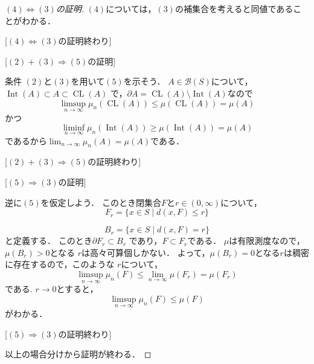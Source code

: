 \documentclass[leqno, a4paper, 12pt]{jsarticle}
\newcommand{\To}{\Longrightarrow}
\DeclareMathOperator{\cl}{CL}
\DeclareMathOperator{\nai}{Int}
\begin{document}
\begin{proof}
[$(4)\iff (3)$の証明]

$(4)$については，$(3)$の補集合を考えると同値であることがわかる．

[$(4)\iff (3)$の証明終わり]

[$(2)+(3)\To(5)$の証明]

条件
$(2)$と$(3)$を用いて$(5)$を示そう．
$A\in \mathcal{B}(S)$について，$\nai(A)\subset A\subset \cl(A)$
で，$\partial A=\cl(A)\setminus \nai(A)$なので
\[
\limsup_{n\to \infty}\mu_n(\cl(A))\le \mu(\cl(A))=\mu(A)
\]
かつ
\[
\liminf_{n\to \infty}\mu_n(\nai(A))\ge \mu(\nai(A))=\mu(A)
\]
であるから$\lim_{n\to \infty}\mu_n(A)=\mu(A)$である．

[$(2)+(3)\To(5)$の証明終わり]

[$(5)\To(3)$の証明]

逆に$(5)$を仮定しよう．
このとき閉集合$F$と$r\in  (0, \infty)$について，
\[
F_{r}=\{x\in S\mid d(x, F)\le r\}
\]

\[
B_r=\{x\in S\mid d(x, F)=r\}
\]
と定義する．
このとき$\partial F_r\subset B_r$
であり，$F\subset F_r$である．
$\mu$は有限測度なので，$\mu(B_r)>0$となる
$r$は高々可算個しかない．
よって，$\mu(B_r)=0$となる$r$は稠密に存在するので，このような
$r$について，
\[
\limsup_{n\to \infty}\mu_n(F)\le \lim_{n\to \infty}\mu(F_r)=\mu(F_r)
\]
である.
$r\to 0$とすると，
\[
\limsup_{n\to \infty}\mu_n(F)\le \mu(F)
\]
がわかる．

[$(5)\To(3)$の証明終わり]

以上の場合分けから証明が終わる．
\end{proof}
\end{document}
